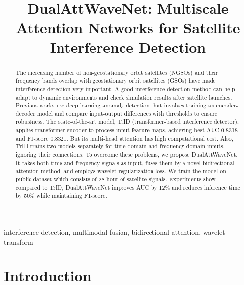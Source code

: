 \documentclass[conference]{IEEEtran}
\begin{document}
\title{DualAttWaveNet: Multiscale Attention Networks for Satellite Interference Detection}

\author{
}




\maketitle

\begin{abstract}
    The increasing number of non-geostationary orbit satellites (NGSOs) and their frequency bands overlap with geostationary orbit satellites (GSOs) have made interference detection very important. A good interference detection method can help adapt to dynamic environments and check simulation results after satellite launches. Previous works use deep learning anomaly detection that involves training an encoder-decoder model and compare input-output differences with thresholds to ensure robustness. The state-of-the-art model, TrID (transformer-based interference detector), applies transformer encoder to process input feature maps, achieving best AUC 0.8318 and F1-score 0.8321. But its multi-head attention has high computational cost. Also, TrID trains two models separately for time-domain and frequency-domain inputs, ignoring their connections. To overcome these problems, we propose DualAttWaveNet. It takes both time and frequency signals as input, fuses them by a novel bidirectional attention method, and employs wavelet regularization loss. We train the model on public dataset which consists of 28 hour of satellite signals. Experiments show compared to TrID, DualAttWaveNet improves AUC by 12\% and reduces inference time by 50\% while maintaining F1-score. \end{abstract}

\begin{IEEEkeywords}
    interference detection, multimodal fusion, bidirectional attention, wavelet transform
\end{IEEEkeywords}

\section{Introduction}
\label{sec:intro}
\end{document}
